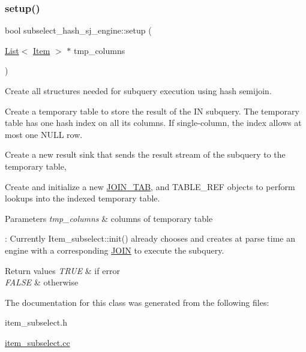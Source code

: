 \mbox{\label{classsubselect__hash__sj__engine_af8a5ad2eafdc200158334f926434ccda}} 
\subsubsection{\texorpdfstring{setup()}{setup()}}
{\footnotesize\ttfamily bool subselect\+\_\+hash\+\_\+sj\+\_\+engine\+::setup (\begin{DoxyParamCaption}\item[{\mbox{\hyperlink{classList}{List}}$<$ \mbox{\hyperlink{classItem}{Item}} $>$ $\ast$}]{tmp\+\_\+columns }\end{DoxyParamCaption})}

Create all structures needed for subquery execution using hash semijoin.


\begin{DoxyItemize}
\item Create a temporary table to store the result of the IN subquery. The temporary table has one hash index on all its columns. If single-\/column, the index allows at most one N\+U\+LL row.
\item Create a new result sink that sends the result stream of the subquery to the temporary table,
\item Create and initialize a new \mbox{\hyperlink{classJOIN__TAB}{J\+O\+I\+N\+\_\+\+T\+AB}}, and T\+A\+B\+L\+E\+\_\+\+R\+EF objects to perform lookups into the indexed temporary table.
\end{DoxyItemize}


\begin{DoxyParams}{Parameters}
{\em tmp\+\_\+columns} & columns of temporary table\\
\hline
\end{DoxyParams}
\+: Currently Item\+\_\+subselect\+::init() already chooses and creates at parse time an engine with a corresponding \mbox{\hyperlink{classJOIN}{J\+O\+IN}} to execute the subquery.


\begin{DoxyRetVals}{Return values}
{\em T\+R\+UE} & if error \\
\hline
{\em F\+A\+L\+SE} & otherwise \\
\hline
\end{DoxyRetVals}


The documentation for this class was generated from the following files\+:\begin{DoxyCompactItemize}
\item 
item\+\_\+subselect.\+h\item 
\mbox{\hyperlink{item__subselect_8cc}{item\+\_\+subselect.\+cc}}\end{DoxyCompactItemize}
